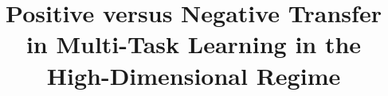 \documentclass{article}
\begin{document}
\title{Positive versus Negative Transfer in Multi-Task Learning in the High-Dimensional Regime}
\maketitle











\newpage
\appendix





\end{document}
